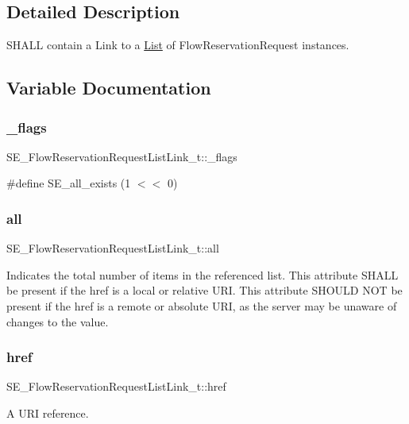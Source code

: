 \subsection{Detailed Description}
S\+H\+A\+LL contain a Link to a \hyperlink{structList}{List} of Flow\+Reservation\+Request instances. 

\subsection{Variable Documentation}
\mbox{\label{group__FlowReservationRequestListLink_ga303689b2785c25ec6c107fcc7d1a6a8f}} 
\subsubsection{\texorpdfstring{\+\_\+flags}{\_flags}}
{\footnotesize\ttfamily S\+E\+\_\+\+Flow\+Reservation\+Request\+List\+Link\+\_\+t\+::\+\_\+flags}

\#define S\+E\+\_\+all\+\_\+exists (1 $<$$<$ 0) \mbox{\label{group__FlowReservationRequestListLink_ga0db45858843bf00feee2e60960b642dd}} 
\subsubsection{\texorpdfstring{all}{all}}
{\footnotesize\ttfamily S\+E\+\_\+\+Flow\+Reservation\+Request\+List\+Link\+\_\+t\+::all}

Indicates the total number of items in the referenced list. This attribute S\+H\+A\+LL be present if the href is a local or relative U\+RI. This attribute S\+H\+O\+U\+LD N\+OT be present if the href is a remote or absolute U\+RI, as the server may be unaware of changes to the value. \mbox{\label{group__FlowReservationRequestListLink_ga1d73c03e68dab44c79e396b96b4fdd6a}} 
\subsubsection{\texorpdfstring{href}{href}}
{\footnotesize\ttfamily S\+E\+\_\+\+Flow\+Reservation\+Request\+List\+Link\+\_\+t\+::href}

A U\+RI reference. 